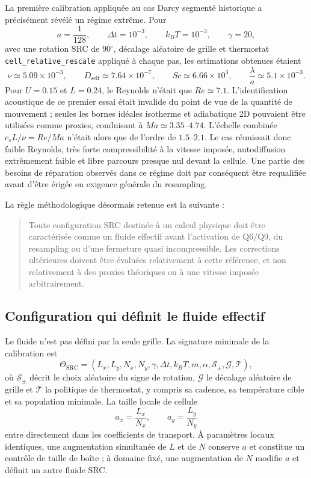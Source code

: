 \documentclass[11pt,a4paper]{article}
\begin{document}
La première calibration appliquée au cas Darcy segmenté historique a précisément révélé un régime extrême. Pour
\begin{equation}
  a=\frac{1}{128},\qquad
  \Delta t=10^{-3},\qquad
  k_BT=10^{-3},\qquad
  \gamma=20,
\end{equation}
avec une rotation SRC de $90^\circ$, décalage aléatoire de grille et thermostat \texttt{cell\_relative\_rescale} appliqué à chaque pas, les estimations obtenues étaient
\begin{equation}
  \nu\simeq5.09\times10^{-3},\qquad
  D_{\mathrm{self}}\simeq7.64\times10^{-7},\qquad
  Sc\simeq6.66\times10^{3},\qquad
  \frac{\lambda}{a}\simeq5.1\times10^{-3}.
\end{equation}
Pour $U=0.15$ et $L=0.24$, le Reynolds n'était que $Re\simeq7.1$. L'identification acoustique de ce premier essai était invalide du point de vue de la quantité de mouvement ; seules les bornes idéales isotherme et adiabatique 2D pouvaient être utilisées comme proxies, conduisant à $Ma\simeq3.35$--$4.74$. L'échelle combinée $c_sL/\nu=Re/Ma$ n'était alors que de l'ordre de $1.5$--$2.1$. Le cas réunissait donc faible Reynolds, très forte compressibilité à la vitesse imposée, autodiffusion extrêmement faible et libre parcours presque nul devant la cellule. Une partie des besoins de réparation observés dans ce régime doit par conséquent être requalifiée avant d'être érigée en exigence générale du resampling.

La règle méthodologique désormais retenue est la suivante :
\begin{quote}
Toute configuration SRC destinée à un calcul physique doit être caractérisée comme un fluide effectif avant l'activation de Q6/Q9, du resampling ou d'une fermeture quasi incompressible. Les corrections ultérieures doivent être évaluées relativement à cette référence, et non relativement à des proxies théoriques ou à une vitesse imposée arbitrairement.
\end{quote}

\subsection{Configuration qui définit le fluide effectif}

Le fluide n'est pas défini par la seule grille. La signature minimale de la calibration est
\begin{equation}
\Theta_{\mathrm{SRC}}=
\left(
L_x,L_y,N_x,N_y,\gamma,\Delta t,k_BT,m,\alpha,
\mathcal{S}_{\pm},\mathcal{G},\mathcal{T}
\right),
\end{equation}
où $\mathcal{S}_{\pm}$ décrit le choix aléatoire du signe de rotation, $\mathcal{G}$ le décalage aléatoire de grille et $\mathcal{T}$ la politique de thermostat, y compris sa cadence, sa température cible et sa population minimale. La taille locale de cellule
\begin{equation}
  a_x=\frac{L_x}{N_x},\qquad a_y=\frac{L_y}{N_y}
\end{equation}
entre directement dans les coefficients de transport. À paramètres locaux identiques, une augmentation simultanée de $L$ et de $N$ conserve $a$ et constitue un contrôle de taille de boîte ; à domaine fixé, une augmentation de $N$ modifie $a$ et définit un autre fluide SRC.
\end{document}
